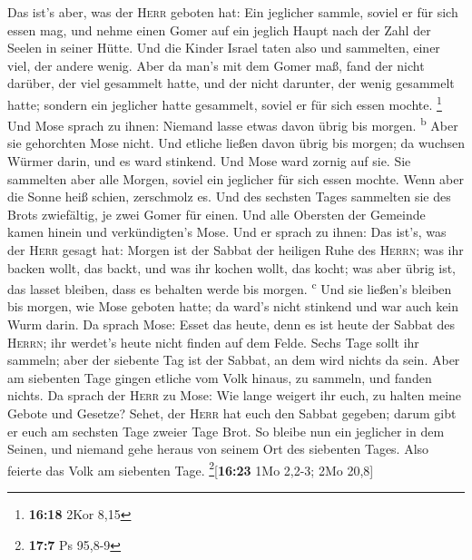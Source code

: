  Das ist's aber, was der \textsc{Herr} geboten hat: Ein
jeglicher sammle, soviel er für sich essen mag, und nehme einen Gomer
auf ein jeglich Haupt nach der Zahl der Seelen in seiner Hütte.
 Und die Kinder Israel taten also und sammelten, einer
viel, der andere wenig.  Aber da man's mit dem Gomer maß,
fand der nicht darüber, der viel gesammelt hatte, und der nicht
darunter, der wenig gesammelt hatte; sondern ein jeglicher hatte
gesammelt, soviel er für sich essen mochte. \footnote{\textbf{16:18}
  2Kor 8,15}  Und Mose sprach zu ihnen: Niemand lasse
etwas davon übrig bis morgen. \textsuperscript{b}  Aber
sie gehorchten Mose nicht. Und etliche ließen davon übrig bis morgen; da
wuchsen Würmer darin, und es ward stinkend. Und Mose ward zornig auf
sie.  Sie sammelten aber alle Morgen, soviel ein
jeglicher für sich essen mochte. Wenn aber die Sonne heiß schien,
zerschmolz es.  Und des sechsten Tages sammelten sie des
Brots zwiefältig, je zwei Gomer für einen. Und alle Obersten der
Gemeinde kamen hinein und verkündigten's Mose.  Und er
sprach zu ihnen: Das ist's, was der \textsc{Herr} gesagt hat: Morgen ist
der Sabbat der heiligen Ruhe des \textsc{Herrn}; was ihr backen wollt,
das backt, und was ihr kochen wollt, das kocht; was aber übrig ist, das
lasset bleiben, dass es behalten werde bis morgen. \textsuperscript{c}
 Und sie ließen's bleiben bis morgen, wie Mose geboten
hatte; da ward's nicht stinkend und war auch kein Wurm darin.
 Da sprach Mose: Esset das heute, denn es ist heute der
Sabbat des \textsc{Herrn}; ihr werdet's heute nicht finden auf dem
Felde.  Sechs Tage sollt ihr sammeln; aber der siebente
Tag ist der Sabbat, an dem wird nichts da sein.  Aber am
siebenten Tage gingen etliche vom Volk hinaus, zu sammeln, und fanden
nichts.  Da sprach der \textsc{Herr} zu Mose: Wie lange
weigert ihr euch, zu halten meine Gebote und Gesetze? 
Sehet, der \textsc{Herr} hat euch den Sabbat gegeben; darum gibt er euch
am sechsten Tage zweier Tage Brot. So bleibe nun ein jeglicher in dem
Seinen, und niemand gehe heraus von seinem Ort des siebenten Tages.
 Also feierte das Volk am siebenten Tage.
\footnote{\textbf{17:7} Ps 95,8-9}{[}\textbf{16:23} 1Mo 2,2-3; 2Mo
20,8{]}

